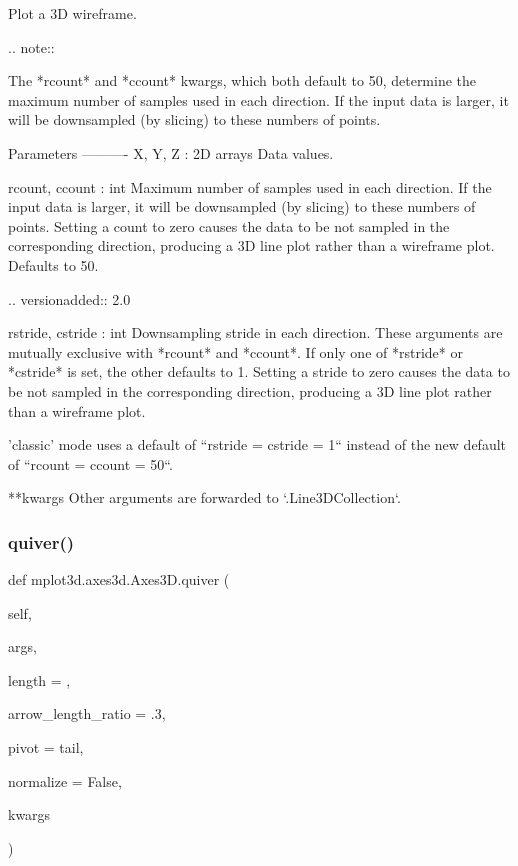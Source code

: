\begin{DoxyVerb}
\begin{DoxyVerb}Plot a 3D wireframe.

.. note::

   The *rcount* and *ccount* kwargs, which both default to 50,
   determine the maximum number of samples used in each direction.  If
   the input data is larger, it will be downsampled (by slicing) to
   these numbers of points.

Parameters
----------
X, Y, Z : 2D arrays
    Data values.

rcount, ccount : int
    Maximum number of samples used in each direction.  If the input
    data is larger, it will be downsampled (by slicing) to these
    numbers of points.  Setting a count to zero causes the data to be
    not sampled in the corresponding direction, producing a 3D line
    plot rather than a wireframe plot.  Defaults to 50.

    .. versionadded:: 2.0

rstride, cstride : int
    Downsampling stride in each direction.  These arguments are
    mutually exclusive with *rcount* and *ccount*.  If only one of
    *rstride* or *cstride* is set, the other defaults to 1.  Setting a
    stride to zero causes the data to be not sampled in the
    corresponding direction, producing a 3D line plot rather than a
    wireframe plot.

    'classic' mode uses a default of ``rstride = cstride = 1`` instead
    of the new default of ``rcount = ccount = 50``.

**kwargs
    Other arguments are forwarded to `.Line3DCollection`.
\end{DoxyVerb}
 \mbox{\label{classmplot3d_1_1axes3d_1_1Axes3D_a410785cc1be6faf5eafbb44ad427a790}} 
\subsubsection{\texorpdfstring{quiver()}{quiver()}}
{\footnotesize\ttfamily def mplot3d.\+axes3d.\+Axes3\+D.\+quiver (\begin{DoxyParamCaption}\item[{}]{self,  }\item[{}]{args,  }\item[{}]{length = {},  }\item[{}]{arrow\+\_\+length\+\_\+ratio = {\ttfamily .3},  }\item[{}]{pivot = {\ttfamily \textquotesingle{}tail\textquotesingle{}},  }\item[{}]{normalize = {\ttfamily False},  }\item[{}]{kwargs }\end{DoxyParamCaption})}


\end{DoxyVerb}
